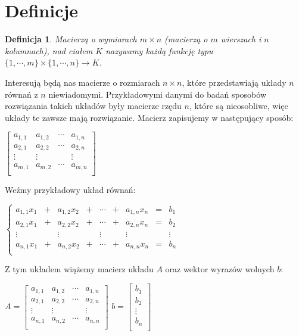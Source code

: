 \documentclass[a4paper,10pt]{article}
\newtheorem{definition}{Definicja}
\begin{document}
\section{Definicje}
\begin{definition}
	Macierzą o wymiarach $m \times n$ (macierzą o $m$ wierszach i $n$ kolumnach), nad ciałem $K$ nazywamy każdą funkcję typu $\{1,\cdots,m\} \times \{1,\cdots,n\} \rightarrow K$.
\end{definition}
Interesują będą nas macierze o rozmiarach $n \times n$, które przedstawiają układy $n$ równań z $n$ niewiadomymi. Przykładowymi danymi do badań sposobów rozwiązania takich układów były macierze rzędu $n$, które są nieosobliwe, więc układy te zawsze mają rozwiązanie.
Macierz zapisujemy w następujący sposób:
\begin{center}
	$ \left[ \begin{array}{cccc}
		a_{1,1} & a_{1,2} & \cdots & a_{1,n}\\
		a_{2,1} & a_{2,2} & \cdots & a_{2,n}\\
		\vdots  &  \vdots &        & \vdots \\
		a_{m,1} & a_{m,2} & \cdots & a_{m,n}\\
	\end{array} \right] $
\end{center}
\newpage
Weźmy przykładowy układ równań:
\begin{center}
$ \left \{ \begin{array}{ccccccccc}
		a_{1,1}x_{1} & + & a_{1,2}x_{2} & + & \cdots & + & a_{1,n}x_{n} & = & b_{1}\\
		a_{2,1}x_{1} & + & a_{2,2}x_{2} & + & \cdots & + & a_{2,n}x_{n} & = & b_{2}\\
		\vdots & & \vdots & &  \vdots & & \vdots & & \vdots \\
		a_{n,1}x_{1} & + & a_{n,2}x_{2} & + & \cdots & + & a_{n,n}x_{n} & = & b_{n}\\
       \end{array} \right. $
\end{center}
Z tym układem wiążemy macierz układu $A$ oraz wektor wyrazów wolnych $b$:
\begin{center}
$A = \left[ \begin{array}{ccccccccc}
		a_{1,1} & a_{1,2} & \cdots & a_{1,n}\\
		a_{2,1} & a_{2,2} & \cdots & a_{2,n}\\
		\vdots  &  \vdots &        & \vdots \\
		a_{n,1} & a_{n,2} & \cdots & a_{n,n}\\
       \end{array} \right] $
$b = \left[ \begin{array}{c}
		b_{1}\\
		b_{2}\\
		\vdots\\
		b_{n}\\
       \end{array} \right] $
\end{center}
\end{document}
